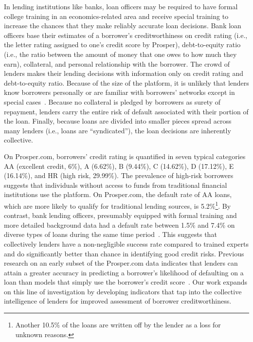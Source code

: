 \documentclass[sigconf]{acmart}
\begin{document}
In lending institutions like banks, loan officers may be required to have formal college training in an economics-related area and receive special training to increase the chances that they make reliably accurate loan decisions. Bank loan officers base their estimates of a borrower's creditworthiness on credit rating (i.e., the letter rating assigned to one's credit score by Prosper), debt-to-equity ratio (i.e., the ratio between the amount of money that one owes to how much they earn), collateral, and personal relationship with the borrower. The crowd of lenders makes their lending decisions with information only on credit rating and debt-to-equity ratio. Because of the size of the platform, it is unlikely that lenders know borrowers personally or are familiar with borrowers' networks except in special cases~\cite{Horvat2015}. Because no collateral is pledged by borrowers as surety of repayment, lenders carry the entire risk of default associated with their portion of the loan. Finally, because loans are divided into smaller pieces spread across many lenders (i.e., loans are ``syndicated''), the loan decisions are inherently collective.

On Prosper.com, borrowers' credit rating is quantified in seven typical categories AA (excellent credit, 6\%), A (6.62\%), B (9.44\%), C (14.62\%), D (17.12\%), E (16.14\%), and HR (high risk, 29.99\%). The prevalence of high-risk borrowers suggests that individuals without access to funds from traditional financial institutions use the platform. On Prosper.com, the default rate of AA loans, which are more likely to qualify for traditional lending sources, is 5.2\%\footnote{Another 10.5\% of the loans are written off by the lender as a loss for unknown reasons.}. By contrast, bank lending officers, presumably equipped with formal training and more detailed background data had a default rate between 1.5\% and 7.4\% on diverse types of loans during the same time period~\cite{FedReserve}. This suggests that collectively lenders have a non-negligible success rate compared to trained experts and do significantly better than chance in identifying good credit risks. Previous research on an early subset of the Prosper.com data indicates that lenders can attain a greater accuracy in predicting a borrower's likelihood of defaulting on a loan than models that simply use the borrower's credit score~\cite{iyer2015screening}. Our work expands on this line of investigation by developing indicators that tap into the collective intelligence of lenders for improved assessment of borrower creditworthiness.
\end{document}
